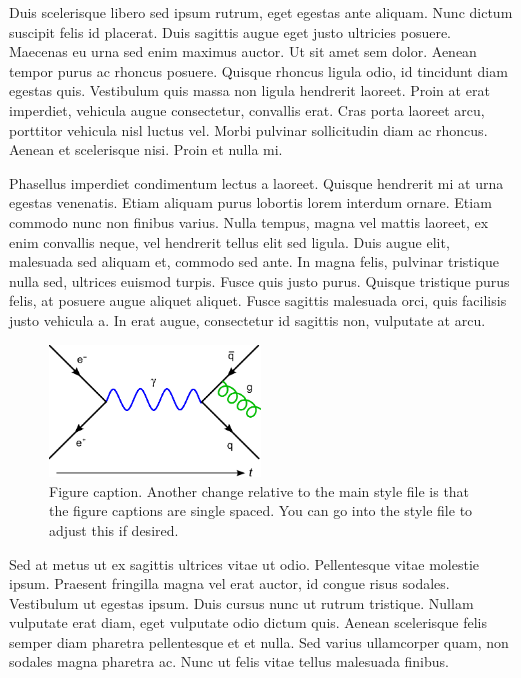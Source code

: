 \documentclass[main.tex]{subfiles}
\begin{document}
Duis scelerisque libero sed ipsum rutrum, eget egestas ante aliquam. Nunc dictum suscipit felis id placerat. Duis sagittis augue eget justo ultricies posuere. Maecenas eu urna sed enim maximus auctor. Ut sit amet sem dolor. Aenean tempor purus ac rhoncus posuere. Quisque rhoncus ligula odio, id tincidunt diam egestas quis. Vestibulum quis massa non ligula hendrerit laoreet. Proin at erat imperdiet, vehicula augue consectetur, convallis erat. Cras porta laoreet arcu, porttitor vehicula nisl luctus vel. Morbi pulvinar sollicitudin diam ac rhoncus. Aenean et scelerisque nisi. Proin et nulla mi.

Phasellus imperdiet condimentum lectus a laoreet. Quisque hendrerit mi at urna egestas venenatis. Etiam aliquam purus lobortis lorem interdum ornare. Etiam commodo nunc non finibus varius. Nulla tempus, magna vel mattis laoreet, ex enim convallis neque, vel hendrerit tellus elit sed ligula. Duis augue elit, malesuada sed aliquam et, commodo sed ante. In magna felis, pulvinar tristique nulla sed, ultrices euismod turpis. Fusce quis justo purus. Quisque tristique purus felis, at posuere augue aliquet aliquet. Fusce sagittis malesuada orci, quis facilisis justo vehicula a. In erat augue, consectetur id sagittis non, vulputate at arcu.

\begin{figure}[t]
    \centering
    \includegraphics[width=0.5\textwidth]{figures/ch2/sample.pdf}
    \caption{
        Figure caption. Another change relative to the main style file is that the figure captions are single spaced. You can go into the style file to adjust this if desired.
    }
    \label{fig:ch2:sample}
\end{figure}

Sed at metus ut ex sagittis ultrices vitae ut odio. Pellentesque vitae molestie ipsum. Praesent fringilla magna vel erat auctor, id congue risus sodales. Vestibulum ut egestas ipsum. Duis cursus nunc ut rutrum tristique. Nullam vulputate erat diam, eget vulputate odio dictum quis. Aenean scelerisque felis semper diam pharetra pellentesque et et nulla. Sed varius ullamcorper quam, non sodales magna pharetra ac. Nunc ut felis vitae tellus malesuada finibus.
\end{document}
